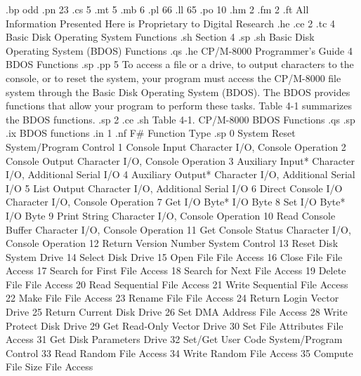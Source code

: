 .bp odd
.pn 23
.cs 5
.mt 5
.mb 6
.pl 66
.ll 65
.po 10
.hm 2
.fm 2
.ft All Information Presented Here is Proprietary to Digital Research
.he
.ce 2
.tc 4  Basic Disk Operating System Functions
.sh
Section 4
.sp
.sh
Basic Disk Operating System (BDOS) Functions
.qs
.he CP/M-8000 Programmer's Guide                     4  BDOS Functions
.sp
.pp 5
To access a file or a drive, to output characters to the console, or
to  reset the  system, your program  must access the CP/M-8000
file system through the Basic Disk Operating System (BDOS). 
The BDOS provides functions that allow your program to perform 
these tasks. Table 4-1 summarizes the BDOS functions.
.sp 2
.ce
.sh
Table 4-1.  CP/M-8000 BDOS Functions
.qs
.sp
.ix BDOS functions
.in 1
.nf
F#     Function                    Type
.sp
 0  System Reset          System/Program Control
 1  Console Input         Character I/O, Console Operation
 2  Console Output        Character I/O, Console Operation 
 3  Auxiliary Input*      Character I/O, Additional Serial I/O
 4  Auxiliary Output*     Character I/O, Additional Serial I/O
 5  List Output           Character I/O, Additional Serial I/O
 6  Direct Console I/O    Character I/O, Console Operation
 7  Get I/O Byte*         I/O Byte
 8  Set I/O Byte*         I/O Byte
 9  Print String          Character I/O, Console Operation
10  Read Console Buffer   Character I/O, Console Operation
11  Get Console Status    Character I/O, Console Operation
12  Return Version Number System Control
13  Reset Disk System     Drive
14  Select Disk           Drive
15  Open File             File Access
16  Close File            File Access
17  Search for First      File Access
18  Search for Next       File Access
19  Delete File           File Access
20  Read Sequential       File Access
21  Write Sequential      File Access
22  Make File             File Access
23  Rename File           File Access
24  Return Login Vector   Drive
25  Return Current Disk   Drive       
26  Set DMA Address       File Access
28  Write Protect Disk    Drive
29  Get Read-Only Vector  Drive
30  Set File Attributes   File Access
31  Get Disk Parameters   Drive
32  Set/Get User Code     System/Program Control
33  Read Random           File Access
34  Write Random          File Access
35  Compute File Size     File Access

